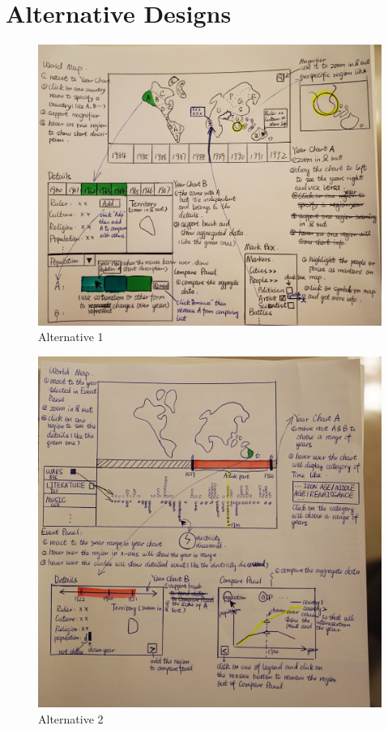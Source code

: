 \documentclass[12pt, fullpage,letterpaper]{article}
\begin{document}
\section{Alternative Designs}
\begin{figure}[h!]
    \begin{center}
        \includegraphics[width=\textwidth]{alternative1.JPG}
        \caption{Alternative 1}
        \label{fig:alt1}
    \end{center}
\end{figure}

\begin{figure}[h!]
    \begin{center}
        \includegraphics[width=\textwidth]{alternative2.JPG}
        \caption{Alternative 2}
        \label{fig:alt2}
    \end{center}
\end{figure}
\end{document}
